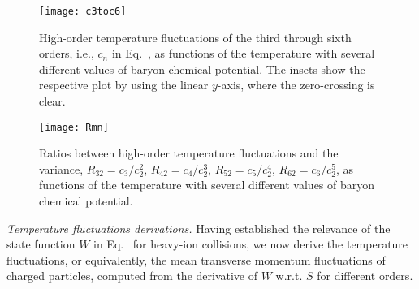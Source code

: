 \documentclass[aps,twocolumn,prd,superscriptaddress,nofootinbib,floatfix]{revtex4-2}
\begin{document}
%
\begin{figure*}[t]
\texttt{[image: c3toc6]}
\caption{High-order temperature fluctuations of the third through sixth orders, i.e., $c_n$ in Eq.~, as functions of the temperature with several different values of baryon chemical potential. The insets show the respective plot by using the linear $y$-axis, where the zero-crossing is clear.}
\label{fig:c3-c6}
\end{figure*}
%

%
\begin{figure*}[t]
\texttt{[image: Rmn]}
\caption{Ratios between high-order temperature fluctuations and the variance, $R_{32}=c_3/c_2^2$, $R_{42}=c_4/c_2^3$, $R_{52}=c_5/c_2^4$, $R_{62}=c_6/c_2^5$, as functions of the temperature with several different values of baryon chemical potential.}
\label{fig:Rmn}
\end{figure*}
%



\textit{Temperature fluctuations derivations.} \label{sec:tem-fluc}  
Having established the relevance of the state function $W$ in Eq.~ for heavy-ion collisions, we now derive the temperature fluctuations, or equivalently, the mean transverse momentum fluctuations of charged particles, computed from the derivative of $W$ w.r.t. $S$ for different orders.
\end{document}
